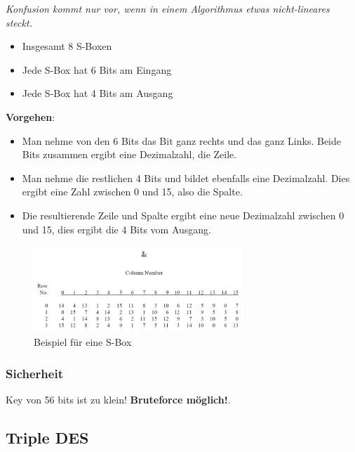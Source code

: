 \emph{Konfusion kommt nur vor, wenn in einem Algorithmus etwas
nicht-lineares steckt.}

\begin{itemize}
\tightlist
\item
  Insgesamt 8 S-Boxen
\item
  Jede S-Box hat 6 Bits am Eingang
\item
  Jede S-Box hat 4 Bits am Ausgang
\end{itemize}

\textbf{Vorgehen}: 
\begin{itemize}
    \item Man nehme von den 6 Bits das Bit ganz rechts und das ganz Links. Beide Bits zusammen ergibt eine Dezimalzahl, die Zeile.
    \item Man nehme die restlichen 4 Bits und bildet ebenfalls eine Dezimalzahl. Dies ergibt eine Zahl zwischen 0 und 15, also die Spalte.
    \item Die resultierende Zeile und Spalte ergibt eine neue Dezimalzahl zwischen 0 und 15, dies ergibt die 4 Bits vom Ausgang.
\end{itemize}

\begin{figure}[H]
\centering
\includegraphics[width=0.7\textwidth]{figures/sBox1.png}
\caption{Beispiel für eine S-Box}
\end{figure}

\hypertarget{sicherheit}{%
\subsubsection{Sicherheit}\label{sicherheit}}

Key von 56 bits ist zu klein! \textbf{Bruteforce möglich!}.

\hypertarget{triple-des}{%
\subsection{Triple DES}\label{triple-des}}


